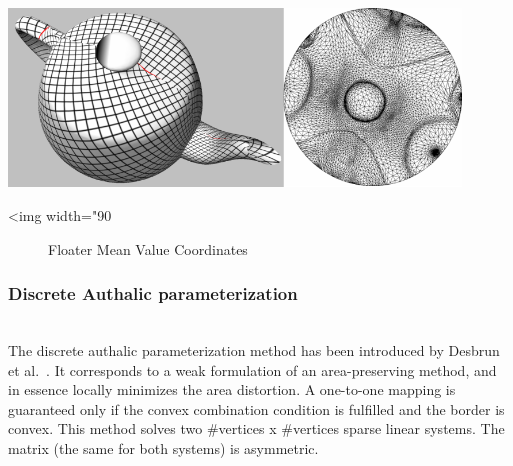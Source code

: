 \begin{center}
    \label{Surface_mesh_parameterization-fig-floater}
    \begin{ccTexOnly}
      \includegraphics[width=0.9\textwidth]{Surface_mesh_parameterization/floater}
    \end{ccTexOnly}
    \begin{ccHtmlOnly}
        <img width="90%
    \end{ccHtmlOnly}
    \begin{figure}[ht]
        \caption{Floater Mean Value Coordinates}
    \end{figure}
\end{center}

\subsubsection{Discrete Authalic parameterization}

  \\

The discrete authalic parameterization method has been introduced by
Desbrun et al.~\cite{cgal:dma-ipsm-02}. It corresponds to
a weak formulation of an area-preserving method, and in essence
locally minimizes the area distortion. A one-to-one mapping is
guaranteed only if the convex combination condition is fulfilled and
the border is convex. This method solves two
\#vertices x \#vertices sparse linear systems. The matrix (the same
for both systems) is asymmetric.

